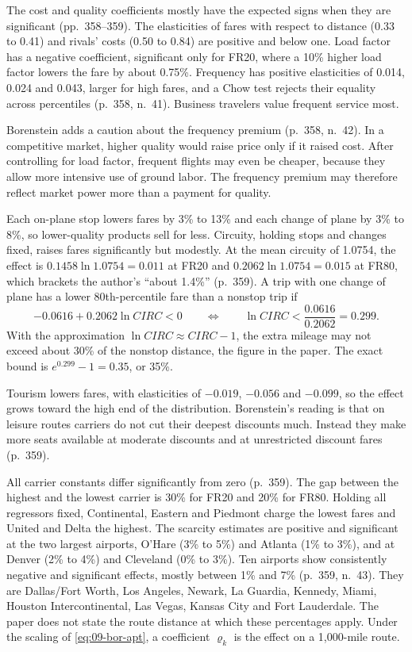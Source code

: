 The cost and quality coefficients mostly have the expected signs when they are significant (pp.~358--359). The
elasticities of fares with respect to distance (0.33 to 0.41) and rivals' costs (0.50 to 0.84) are positive and
below one. Load factor has a negative coefficient, significant only for FR20, where a 10\% higher load factor
lowers the fare by about 0.75\%. Frequency has positive elasticities of 0.014, 0.024 and 0.043, larger for high
fares, and a Chow test rejects their equality across percentiles (p.~358, n.~41). Business travelers value
frequent service most.

Borenstein adds a caution about the frequency premium (p.~358, n.~42). In a competitive market, higher quality
would raise price only if it raised cost. After controlling for load factor, frequent flights may even be
cheaper, because they allow more intensive use of ground labor. The frequency premium may therefore reflect
market power more than a payment for quality.

Each on-plane stop lowers fares by 3\% to 13\% and each change of plane by 3\% to 8\%, so lower-quality products
sell for less. Circuity, holding stops and changes fixed, raises fares significantly but modestly. At the mean
circuity of 1.0754, the effect is $0.1458 \ln 1.0754 = 0.011$ at FR20 and $0.2062 \ln 1.0754 = 0.015$ at FR80,
which brackets the author's ``about 1.4\%'' (p.~359). A trip with one change of plane has a lower
80th-percentile fare than a nonstop trip if
\begin{equation*}
-0.0616 + 0.2062 \ln \mathit{CIRC} < 0
\qquad \Longleftrightarrow \qquad
\ln \mathit{CIRC} < \frac{0.0616}{0.2062} = 0.299 .
\end{equation*}
With the approximation $\ln \mathit{CIRC} \approx \mathit{CIRC} - 1$, the extra mileage may not exceed about 30\%
of the nonstop distance, the figure in the paper. The exact bound is $e^{0.299} - 1 = 0.35$, or 35\%.

Tourism lowers fares, with elasticities of $-0.019$, $-0.056$ and $-0.099$, so the effect grows toward the high
end of the distribution. Borenstein's reading is that on leisure routes carriers do not cut their deepest
discounts much. Instead they make more seats available at moderate discounts and at unrestricted discount fares
(p.~359).

 All carrier constants differ significantly from zero (p.~359). The
gap between the highest and the lowest carrier is 30\% for FR20 and 20\% for FR80. Holding all regressors
fixed, Continental, Eastern and Piedmont charge the lowest fares and United and Delta the highest. The scarcity
estimates are positive and significant at the two largest airports, O'Hare (3\% to 5\%) and Atlanta (1\% to
3\%), and at Denver (2\% to 4\%) and Cleveland (0\% to 3\%). Ten airports show consistently negative and
significant effects, mostly between 1\% and 7\% (p.~359, n.~43). They are Dallas/Fort Worth, Los Angeles,
Newark, La Guardia, Kennedy, Miami, Houston Intercontinental, Las Vegas, Kansas City and Fort Lauderdale. The
paper does not state the route distance at which these percentages apply. Under the scaling of
\cref{eq:09-bor-apt}, a coefficient $\varrho_k$ is the effect on a 1,000-mile route.

